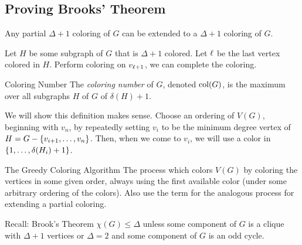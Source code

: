 \subsection{Proving Brooks' Theorem}\label{sec:provingBrook}
\begin{lem}{}
	Any partial $\Delta+1$ coloring of $G$ can be extended to a $\Delta+1$ coloring of $G$.	
\end{lem}
\begin{prf}
	Let $H$ be some subgraph of $G$ that is $\Delta+1$ colored. Let $\ell$ be the last vertex colored in $H$. Perform coloring on $v_{\ell+1}$, we can complete the coloring. 
\end{prf}
\begin{df}{Coloring Number}
	The \textit{coloring number} of $G$, denoted $\mathrm{col}(G)$, is the maximum over all subgraphs $H$ of $G$ of $\delta(H)+1$.
\end{df}
\begin{prf}
	We will show this definition makes sense. Choose an ordering of $V(G)$, beginning with $v_n$, by repeatedly setting $v_i$ to be the minimum degree vertex of $H=G-\qty{v_{i+1},\dots,v_n}$. Then, when we come to $v_i$, we will use a color in $\qty{1,\dots,\delta(H_i)+1}$.
\end{prf}
\begin{thm}{The Greedy Coloring Algorithm}
	The process which colors $V(G)$ by coloring the vertices in some given order, always using the first available color (under some arbitrary ordering of the colors). Also use the term for the analogous process for extending a partial coloring. 
\end{thm}
\begin{thm}{Recall: Brook's Theorem}
	$\chi(G)\leq\Delta$ unless some component of $G$ is a clique with $\Delta+1$ vertices or $\Delta=2$ and some component of $G$ is an odd cycle. 	
\end{thm}

